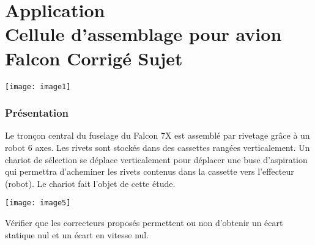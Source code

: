 \chapter*{Application  \\ 
Cellule d'assemblage pour avion Falcon  \ifprof Corrigé \else Sujet \fi}


\iflivret {} \else
\ifprof  {} \else \fi
\fi
\setcounter{question}{0}

\begin{marginfigure}
\centering
\texttt{[image: image1]}
\end{marginfigure}



\subsection*{Présentation}
Le tronçon central du fuselage du Falcon 7X est assemblé par rivetage grâce à un robot 6 axes. Les rivets sont stockés dans des cassettes rangées verticalement. Un chariot de sélection se déplace verticalement pour déplacer une buse d'aspiration qui permettra d'acheminer les rivets contenus dans la cassette vers l'effecteur (robot). Le chariot fait l'objet de cette étude.

\begin{center}
\texttt{[image: image5]}
\end{center} 

\begin{obj}
Vérifier que les correcteurs proposés permettent ou non d'obtenir un écart statique nul et un écart en vitesse nul.
\end{obj}
% 

%




